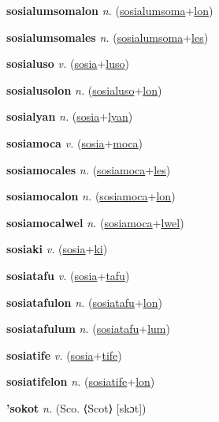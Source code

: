 \textbf{\hypertarget{sosialumsomalon}{sosialumsomalon}} \textit{n.} (\hyperlink{sosialumsoma}{sosialumsoma}+\allowbreak \hyperlink{lon}{lon})


\textbf{\hypertarget{sosialumsomales}{sosialumsomales}} \textit{n.} (\hyperlink{sosialumsoma}{sosialumsoma}+\allowbreak \hyperlink{les}{les})


\textbf{\hypertarget{sosialuso}{sosialuso}} \textit{v.} (\hyperlink{sosia}{sosia}+\allowbreak \hyperlink{luso}{luso})


\textbf{\hypertarget{sosialusolon}{sosialusolon}} \textit{n.} (\hyperlink{sosialuso}{sosialuso}+\allowbreak \hyperlink{lon}{lon})


\textbf{\hypertarget{sosialyan}{sosialyan}} \textit{n.} (\hyperlink{sosia}{sosia}+\allowbreak \hyperlink{lyan}{lyan})


\textbf{\hypertarget{sosiamoca}{sosiamoca}} \textit{v.} (\hyperlink{sosia}{sosia}+\allowbreak \hyperlink{moca}{moca})


\textbf{\hypertarget{sosiamocales}{sosiamocales}} \textit{n.} (\hyperlink{sosiamoca}{sosiamoca}+\allowbreak \hyperlink{les}{les})


\textbf{\hypertarget{sosiamocalon}{sosiamocalon}} \textit{n.} (\hyperlink{sosiamoca}{sosiamoca}+\allowbreak \hyperlink{lon}{lon})


\textbf{\hypertarget{sosiamocalwel}{sosiamocalwel}} \textit{n.} (\hyperlink{sosiamoca}{sosiamoca}+\allowbreak \hyperlink{lwel}{lwel})


\textbf{\hypertarget{sosiaki}{sosiaki}} \textit{v.} (\hyperlink{sosia}{sosia}+\allowbreak \hyperlink{ki}{ki})


\textbf{\hypertarget{sosiatafu}{sosiatafu}} \textit{v.} (\hyperlink{sosia}{sosia}+\allowbreak \hyperlink{tafu}{tafu})


\textbf{\hypertarget{sosiatafulon}{sosiatafulon}} \textit{n.} (\hyperlink{sosiatafu}{sosiatafu}+\allowbreak \hyperlink{lon}{lon})


\textbf{\hypertarget{sosiatafulum}{sosiatafulum}} \textit{n.} (\hyperlink{sosiatafu}{sosiatafu}+\allowbreak \hyperlink{lum}{lum})


\textbf{\hypertarget{sosiatife}{sosiatife}} \textit{v.} (\hyperlink{sosia}{sosia}+\allowbreak \hyperlink{tife}{tife})


\textbf{\hypertarget{sosiatifelon}{sosiatifelon}} \textit{n.} (\hyperlink{sosiatife}{sosiatife}+\allowbreak \hyperlink{lon}{lon})


\textbf{\hypertarget{'sokot}{'sokot}} \textit{n.} (Sco. ⟨Scot⟩ [skɔt])


